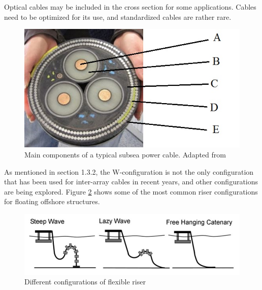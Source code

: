 \noindent Optical cables may be included in the cross section for some applications. Cables need to be optimized for its use, and standardized cables are rather rare. 


\begin{figure}[H]
\centering
\includegraphics[scale=0.8]{figures/pcable}
\caption[$\; \:$Main components of a typical subsea power cable]{Main components of a typical subsea power cable. Adapted from  \cite{Boltinha2016} }
 \label{fig:pcable}
\end{figure}

\noindent As mentioned in section 1.3.2, the W-configuration is not the only configuration that has been used for inter-array cables in recent years, and other configurations are being explored. Figure \ref{fig:config} shows some of the most common riser configurations for floating offshore structures. 

\begin{figure}[H]
\centering
\includegraphics[scale=0.8]{figures/config}
\caption[$\; \:$Different configurations of flexible riser]{Different configurations of flexible riser \cite{Thies2012}}
 \label{fig:config}
\end{figure}


